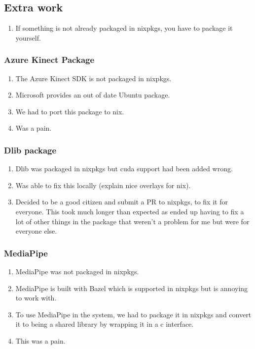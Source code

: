\subsection{Extra work}
\begin{enumerate}
	\item If something is not already packaged in nixpkgs, you have to package it yourself.
\end{enumerate}

\subsubsection{Azure Kinect Package}
\begin{enumerate}
	\item The Azure Kinect SDK is not packaged in nixpkgs.
	\item Microsoft provides an out of date Ubuntu package.
	\item We had to port this package to nix. 
	\item Was a pain.
\end{enumerate}

\subsubsection{Dlib package}
\begin{enumerate}
	\item Dlib was packaged in nixpkgs but cuda support had been added wrong.
	\item Was able to fix this locally (explain nice overlays for nix). 
	\item Decided to be a good citizen and submit a PR to nixpkgs, to fix it for everyone. This took much longer than expected as ended up having to fix a lot of other things in the package that weren't a problem for me but were for everyone else.
\end{enumerate}

\subsubsection{MediaPipe}
\begin{enumerate}
	\item MediaPipe was not packaged in nixpkgs.
	\item MediaPipe is built with Bazel which is supported in nixpkgs but is annoying to work with.
	\item To use MediaPipe in the system, we had to package it in nixpkgs and convert it to being a shared library by wrapping it in a c interface.
	\item This was a pain.
\end{enumerate}
